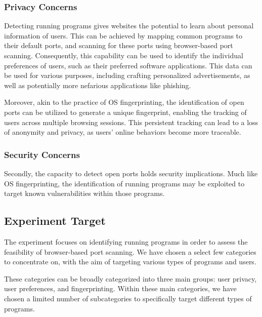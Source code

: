 \subsubsection{Privacy Concerns}

Detecting running programs gives websites the potential to learn about personal information of users. This can be achieved by mapping common programs to their default ports, and scanning for these ports using browser-based port scanning. Consequently, this capability can be used to identify the individual preferences of users, such as their preferred software applications. This data can be used for various purposes, including crafting personalized advertisements, as well as potentially more nefarious applications like phishing.

Moreover, akin to the practice of OS fingerprinting, the identification of open ports can be utilized to generate a unique fingerprint, enabling the tracking of users across multiple browsing sessions. This persistent tracking can lead to a loss of anonymity and privacy, as users' online behaviors become more traceable.

\subsubsection{Security Concerns}

Secondly, the capacity to detect open ports holds security implications. Much like OS fingerprinting, the identification of running programs may be exploited to target known vulnerabilities within those programs. 

\subsection{Experiment Target}

The experiment focuses on identifying running programs in order to assess the feasibility of browser-based port scanning. We have chosen a select few categories to concentrate on, with the aim of targeting various types of programs and users.

These categories can be broadly categorized into three main groups: user privacy, user preferences, and fingerprinting. Within these main categories, we have chosen a limited number of subcategories to specifically target different types of programs.

